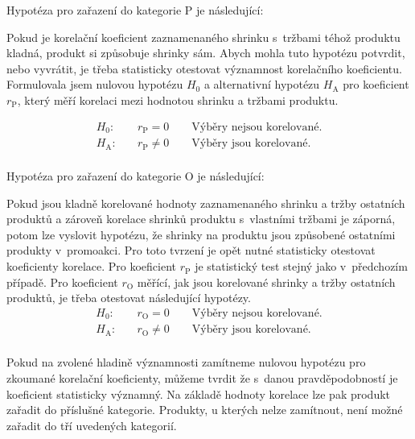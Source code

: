 Hypotéza pro zařazení do kategorie P je následující:

Pokud je korelační koeficient zaznamenaného shrinku s~tržbami téhož produktu kladná, produkt si způsobuje shrinky sám.
Abych mohla tuto hypotézu potvrdit, nebo vyvrátit, je třeba statisticky otestovat významnost korelačního koeficientu. Formulovala jsem nulovou hypotézu $H_\mathrm{0}$ a alternativní hypotézu $H_\mathrm{A}$ pro koeficient $r_\mathrm{P}$, který měří korelaci mezi hodnotou shrinku a tržbami produktu.

\begin{equation*}
    \begin{aligned}
        H_\mathrm{0}: \quad & r_\mathrm{P} = 0 \qquad \mbox{Výběry nejsou korelované.}  \\
        H_\mathrm{A}: \quad & r_\mathrm{P} \neq 0 \qquad\mbox{Výběry jsou korelované.}\\
    \end{aligned}
\end{equation*}

Hypotéza pro zařazení do kategorie O je následující:

Pokud jsou kladně korelované hodnoty zaznamenaného shrinku a tržby ostatních produktů a zároveň korelace shrinků produktu s~vlastními tržbami je záporná, potom lze vyslovit hypotézu, že shrinky na produktu jsou způsobené ostatními produkty v~promoakci.
Pro toto tvrzení je opět nutné statisticky otestovat koeficienty korelace. Pro koeficient $r_\mathrm{P}$ je statistický test stejný jako v~předchozím případě. Pro koeficient $r_\mathrm{O}$ měřící, jak jsou korelované shrinky a tržby ostatních produktů, je třeba otestovat následující hypotézy.
\begin{equation*}
    \begin{aligned}
        H_\mathrm{0}: \quad & r_\mathrm{O} = 0 \qquad \mbox{Výběry nejsou korelované.}  \\
        H_\mathrm{A}: \quad & r_\mathrm{O} \neq 0 \qquad\mbox{Výběry jsou korelované.}\\
    \end{aligned}
\end{equation*}

Pokud na zvolené hladině významnosti zamítneme nulovou hypotézu pro zkoumané korelační koeficienty, můžeme tvrdit že s~danou pravděpodobností je koeficient statisticky významný. Na základě hodnoty korelace lze pak produkt zařadit do příslušné kategorie. Produkty, u kterých nelze zamítnout, není možné zařadit do tří uvedených kategorií.

